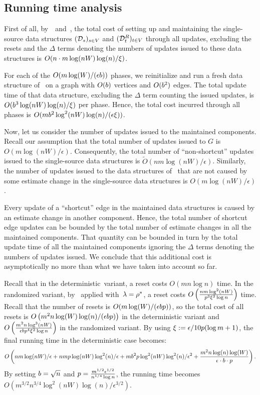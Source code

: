 \documentclass[11pt,letterpaper]{article}
\theoremstyle{plain}
\renewcommand{\O}{O}
\newcommand{\Ot}{\ensuremath{\widetilde{\O}}}
\newcommand{\eps}{\ensuremath{\epsilon}}
\begin{document}
\subsection{Running time analysis}
First of all, by~~and~,
the total cost of setting up and maintaining the single-source data structures $(\mathcal{D}_s)_{s\in V}$
and $(\mathcal{D}^{R}_t)_{t\in V}$ through all updates, excluding the resets and the $\Delta$ terms denoting the numbers of updates issued to these data structures is $O(n\cdot m\log(nW)\log(n)/\xi)$. 

For each of the $\O(m\log(W)/(\eps\phlen))$ phases, we reinitialize and run a fresh data structure of~
on a graph with $\O(\phlen)$ vertices and $\O(\phlen^2)$ edges.
The total update time of that data structure, excluding the $\Delta$ term counting the issued updates, is $\O(\phlen^3\log(nW)\log(n)/\epsp)$ per phase.
Hence, the total cost incurred through all phases is $\O(m\phlen^2\log^2(nW)\log(n)/(\eps\epsp))$.

Now, let us consider the number of updates issued to the maintained components.
Recall our assumption that the total number of updates issued to $G$ is $\O(m\log(nW)/\eps)$.
Consequently, the total number of ``non-shortcut'' updates issued to the single-source data structures is $\Ot(nm\log(nW)/\eps)$.
Similarly, the number of updates issued to the data structures of~ that are not caused by some estimate change in the single-source data structures is $\O(m\log(nW)/\eps)$.

Every update of a ``shortcut'' edge in the maintained data structures is caused by an estimate change in another component.
Hence, the total number of shortcut edge updates can be bounded by the total number of estimate changes in all the maintained components. 
That quantity can be bounded in turn by the total update time of all the maintained components ignoring the $\Delta$ terms denoting the numbers of
updates issued.
We conclude that this additional cost is asymptotically no more than what we have taken into account so far.

Recall that in the deterministic~variant, a reset costs $\O(mn\log{n})$ time.
In the randomized variant, by~ applied with~${\lambda=\rho^*}$, a reset costs $\O\left(\frac{nm\log^2(nW)}{\reset^3\epsp^2\log{n}}\right)$ time.
Recall that the number of resets is $\O(m\log(W)/(\eps\phlen\reset))$,
so the total cost of all resets is $\O\left(m^2n\log(W)\log(n)/(\eps\phlen\reset)\right)$
in the deterministic variant and $\O\left(\frac{m^2n\log^3(nW)}{\eps\phlen\reset^4\epsp^2\log{n}}\right)$
in the randomized variant.
By using \linebreak ${\epsp:=\eps/10\reset(\log{m}+1)}$, the final running time in the deterministic case becomes:
\[ \O\left(nm\log(nW)/\eps+nm\reset\log(nW)\log^2(n)/\eps+m\phlen^2\reset\log^2(nW)\log^2(n)/\eps^2+\frac{m^2n\log(n)\log(W)}{\eps\cdot \phlen\cdot \reset}\right). \]
By setting $b=\sqrt{n}$ and $\reset=\frac{m^{1/2}\eps^{1/2}}{n^{1/4}\log{n}}$, the running
time becomes $\O(m^{3/2}n^{3/4}\log^2(nW)\log(n)/\eps^{3/2})$.
\end{document}
